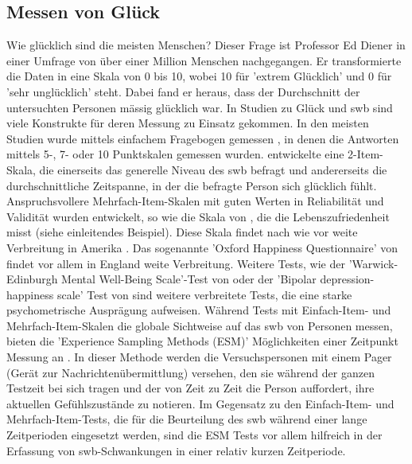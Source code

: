 \subsection{Messen von Glück}\label{subsec.swbMeasuringHappiness}
Wie glücklich sind die meisten Menschen? Dieser Frage ist Professor Ed Diener \citeyear{Myers:1995} in einer Umfrage von über einer Million Menschen nachgegangen. Er transformierte die Daten in eine Skala von 0 bis 10, wobei 10 für 'extrem Glücklich' und 0 für 'sehr unglücklich' steht. Dabei fand er heraus, dass der Durchschnitt der untersuchten Personen mässig glücklich war. \newline
In Studien zu Glück und \gls{swb} sind viele Konstrukte für deren Messung zu Einsatz gekommen. In den meisten Studien wurde mittels einfachem Fragebogen gemessen \cite{Carr:2011}, in denen die Antworten mittels 5-, 7- oder 10 Punktskalen gemessen wurden.  entwickelte eine 2-Item-Skala, die einerseits das generelle Niveau des \gls{swb} befragt und andererseits die durchschnittliche Zeitspanne, in der die befragte Person sich glücklich fühlt. Anspruchsvollere Mehrfach-Item-Skalen mit guten Werten in Reliabilität und Validität wurden entwickelt, so wie die Skala von , die die Lebenszufriedenheit misst (siehe einleitendes Beispiel). Diese Skala findet nach wie vor weite Verbreitung in Amerika \cite{Carr:2011}. Das sogenannte 'Oxford Happiness Questionnaire' von  findet vor allem in England weite Verbreitung. Weitere Tests, wie der 'Warwick-Edinburgh Mental Well-Being Scale'-Test von  oder der 'Bipolar depression-happiness scale' Test von  sind weitere verbreitete Tests, die eine starke psychometrische Ausprägung aufweisen.\newline
Während Tests mit Einfach-Item- und Mehrfach-Item-Skalen die globale Sichtweise auf das \gls{swb} von Personen messen, bieten die 'Experience Sampling Methods (ESM)' Möglichkeiten einer Zeitpunkt Messung an \cite{Hektner:2007}. In dieser Methode werden die Versuchspersonen mit einem Pager (Gerät zur Nachrichtenübermittlung) versehen, den sie während der ganzen Testzeit bei sich tragen und der von Zeit zu Zeit die Person auffordert, ihre aktuellen Gefühlszustände zu notieren. Im Gegensatz zu den Einfach-Item- und Mehrfach-Item-Tests, die für die Beurteilung des \gls{swb} während einer lange Zeitperioden eingesetzt werden, sind die ESM Tests vor allem hilfreich in der Erfassung von \gls{swb}-Schwankungen in einer relativ kurzen Zeitperiode.

